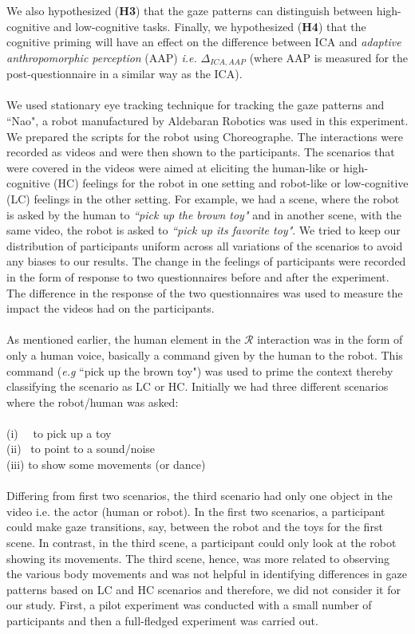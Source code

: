 \documentclass{acm_proc_article-sp}
\begin{document}
We also hypothesized (\textbf{H3}) that the gaze patterns can distinguish
between high-cognitive and low-cognitive tasks. Finally, we hypothesized
(\textbf{H4}) that the cognitive priming will have an effect on the difference
between ICA and \textit{adaptive anthropomorphic perception} (AAP) \textit{i.e.}
$\Delta_{ICA,AAP}$ (where AAP is measured for the post-questionnaire in a
similar way as the ICA). \\ \\ We used stationary eye tracking technique for
tracking the gaze patterns and ``Nao"\cite{mc3}, a robot manufactured by
Aldebaran Robotics was used in this experiment. We prepared the scripts for the
robot using Choreographe. The interactions were recorded as videos and were then
shown to the participants. The scenarios that were covered in the videos were
aimed at eliciting the human-like or high-cognitive (HC) feelings for the robot
in one setting and robot-like or low-cognitive (LC) feelings in the other
setting. For example, we had a scene, where the robot is asked by the human to
\textit{``pick up the brown toy"} and in another scene, with the same video, the
robot is asked to \textit{``pick up its favorite toy"}. We tried to keep our
distribution of participants uniform across all variations of the scenarios to
avoid any biases to our results. The change in the feelings of participants were
recorded in the form of response to two questionnaires before and after the
experiment. The difference in the response of the two questionnaires was used to
measure the impact the videos had on the participants. \\ \\ As mentioned
earlier, the human element in the $\mathcal{R}$ interaction was in the form of
only a human voice, basically a command given by the human to the robot. This
command (\textit{e.g} ``pick up the brown toy") was used to prime the context
thereby classifying the scenario as LC or HC. Initially we had three different
scenarios where the robot/human was asked:\\ \\ (i) \ \ to pick up a toy \\ (ii)
\ to point to a sound/noise \\ (iii) to show some movements (or dance) \\ \\
Differing from first two scenarios, the third scenario had only one object in
the video i.e. the actor (human or robot). In the first two scenarios, a
participant could make gaze transitions, say, between the robot and the toys for
the first scene. In contrast, in the third scene, a participant could only look
at the robot showing its movements. The third scene, hence, was more related to
observing the various body movements and was not helpful in identifying
differences in gaze patterns based on LC and HC scenarios and therefore, we did
not consider it for our study. First, a pilot experiment was conducted with a
small number of participants and then a full-fledged experiment was carried out.
\end{document}
